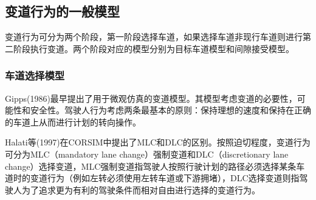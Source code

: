 \subsection{变道行为的一般模型}
变道行为可分为两个阶段，第一阶段选择车道，如果选择车道非现行车道则进行第二阶段执行变道。两个阶段对应的模型分别为目标车道模型和间隙接受模型。
\subsubsection{车道选择模型}

Gipps(1986)最早提出了用于微观仿真的变道模型\cite{Gipps1986}。其模型考虑变道的必要性，可能性和安全性。驾驶人行为考虑两条最基本的原则：保持理想的速度和保持在正确的车道上从而进行计划的转向操作。

Halati等(1997)在CORSIM中提出了MLC和DLC的区别\cite{Halati1997}。按照迫切程度，变道行为可分为MLC（mandatory lane change）强制变道和DLC（discretionary lane change）选择变道，MLC强制变道指驾驶人按照行驶计划的路径必须选择某条车道时的变道行为（例如左转必须使用左转车道或下游拥堵），DLC选择变道则指驾驶人为了追求更为有利的驾驶条件而相对自由进行选择的变道行为。




 



